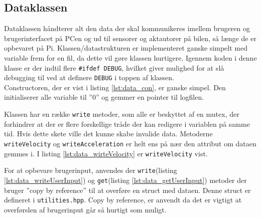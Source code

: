 \subsection{Dataklassen}

Dataklassen håndterer alt den data der skal kommunikeres imellem brugeren og brugerinterfacet på PCen og ud til sensorer og aktautorer på bilen, så længe de er opbevaret på Pi. Klassen/datastrukturen er implementeret ganske simpelt med variable frem for en fil, da dette vil gøre klassen hurtigere. Igennem koden i denne klasse er der indtil flere \texttt{\#ifdef DEBUG}, hvilket giver mulighed for at slå debugging til ved at definere \texttt{DEBUG} i toppen af klassen. \\
Constructoren, der er vist i listing \ref{lst:data_con}, er ganske simpel. Den initialiserer alle variable til ''0'' og gemmer en pointer til logfilen.



Klassen har en række \texttt{write} metoder, som alle er beskyttet af en mutex, der forhindrer at der er flere forskellige tråde der kan redigere i variablen på samme tid. Hvis dette skete ville det kunne skabe invalide data. Metoderne \texttt{writeVelocity} og \texttt{writeAcceleration} er helt ens på nær den attribut om dataen gemmes i. I listing \ref{lst:data_wirteVelocity} er \texttt{writeVelocity} vist.



For at opbevare brugerinput, anvendes der \texttt{write}(listing \ref{lst:data_writeUserInput}) og \texttt{get}(listing \ref{lst:data_getUserInput}) metoder der bruger ''copy by reference'' til at overføre en struct med dataen. Denne struct er defineret i \texttt{utilities.hpp}. Copy by reference, er anvendt da det er vigtigt at overførslen af brugerinput går så hurtigt som muligt.






